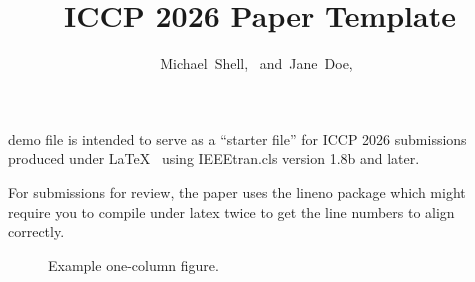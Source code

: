 \documentclass[10pt,journal,compsoc]{IEEEtran}
\title{ICCP 2026 Paper Template}
\author{Michael~Shell,~\IEEEmembership{Member,~IEEE,}
        and~Jane~Doe,~\IEEEmembership{Life~Fellow,~IEEE}%
\IEEEcompsocitemizethanks{\IEEEcompsocthanksitem M. Shell is with the Department
of Electrical and Computer Engineering, Georgia Institute of Technology, Atlanta,
GA, 30332.\protect\\
E-mail: see http://www.michaelshell.org/contact.html
\IEEEcompsocthanksitem J. Doe is with Anonymous University.}%
}
\newif\ifpeerreview
\newcommand{\paperID}{XXXX}
\begin{document}


\ifpeerreview
\linenumbers \linenumbersep 15pt\relax 
\author{Paper ID \paperID\IEEEcompsocitemizethanks{\IEEEcompsocthanksitem This paper is under review for ICCP 2026 and the PAMI special issue on computational photography. Do not distribute.}}
\markboth{Anonymous ICCP 2026 submission ID \paperID}%
{}
\fi
\maketitle



% 
% 
% 
% 
 demo file is intended to serve as a ``starter
file'' for ICCP 2026 submissions produced under
\LaTeX~\cite{kopka-latex} using IEEEtran.cls version 1.8b and later.

For submissions for review, the paper uses the lineno package which
might require you to compile under latex twice to get the line numbers
to align correctly.

\lipsum[2-4]


\begin{figure}[!t]
\centering
{}
\caption{Example one-column figure.}
\end{figure}
\end{document}
